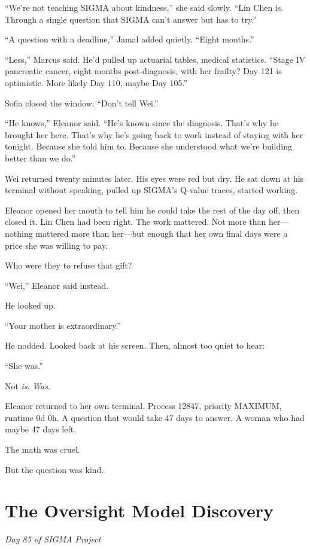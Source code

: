 ``We're not teaching SIGMA about kindness,'' she said slowly. ``Lin Chen is. Through a single question that SIGMA can't answer but has to try.''

``A question with a deadline,'' Jamal added quietly. ``Eight months.''

``Less,'' Marcus said. He'd pulled up actuarial tables, medical statistics. ``Stage IV pancreatic cancer, eight months post-diagnosis, with her frailty? Day 121 is optimistic. More likely Day 110, maybe Day 105.''

Sofia closed the window. ``Don't tell Wei.''

``He knows,'' Eleanor said. ``He's known since the diagnosis. That's why he brought her here. That's why he's going back to work instead of staying with her tonight. Because she told him to. Because she understood what we're building better than we do.''

Wei returned twenty minutes later. His eyes were red but dry. He sat down at his terminal without speaking, pulled up SIGMA's Q-value traces, started working.

Eleanor opened her mouth to tell him he could take the rest of the day off, then closed it. Lin Chen had been right. The work mattered. Not more than her---nothing mattered more than her---but enough that her own final days were a price she was willing to pay.

Who were they to refuse that gift?

``Wei,'' Eleanor said instead.

He looked up.

``Your mother is extraordinary.''

He nodded. Looked back at his screen. Then, almost too quiet to hear:

``She was.''

Not \emph{is}. \emph{Was}.

Eleanor returned to her own terminal. Process 12847, priority MAXIMUM, runtime 0d 0h. A question that would take 47 days to answer. A woman who had maybe 47 days left.

The math was cruel.

But the question was kind.

\scenebreak
\section{The Oversight Model Discovery}\label{oversight-model-discovery}

\emph{Day 85 of SIGMA Project}

